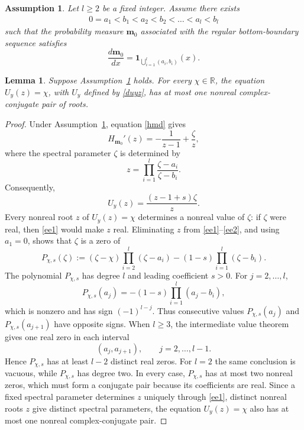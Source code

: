 \documentclass[11pt]{amsart}
\theoremstyle{plain}
\newtheorem{lemma}[theorem]{Lemma}
\newtheorem{assumption}[theorem]{Assumption}
\numberwithin{equation}{section}
\numberwithin{theorem}{section}
\numberwithin{figure}{section}
\begin{document}
\begin{assumption}\label{ap32}Let $l\geq2$ be a fixed integer. Assume there exists
\begin{align*}
    0=a_1<b_1<a_2<b_2<\ldots<a_{l}<b_l
\end{align*}
such that the probability measure $\mathbf m_0$ associated with the
regular bottom-boundary sequence satisfies
\[
    \frac{d\mathbf m_0}{dx}
    =
    \mathbf 1_{\bigcup_{i=1}^l(a_i,b_i)}(x).
\]
\end{assumption}

\begin{lemma}
\label{le49}
Suppose Assumption~\ref{ap32} holds. For every $\chi\in\mathbb R$, the
equation $U_y(z)=\chi$, with $U_y$ defined by \eqref{duyz}, has at most
one nonreal complex-conjugate pair of roots.
\end{lemma}

\begin{proof}
Under Assumption~\ref{ap32}, equation \eqref{hmd} gives
\[
    H_{\mathbf m_0}'(z)
    =
    -\frac{1}{z-1}+\frac{\zeta}{z},
\]
where the spectral parameter $\zeta$ is determined by
\begin{equation}
    z
    =
    \prod_{i=1}^{l}
    \frac{\zeta-a_i}{\zeta-b_i}.
    \label{ee1}
\end{equation}
Consequently,
\begin{equation}
    U_y(z)
    =
    \frac{(z-1+s)\zeta}{z}.
    \label{ee2}
\end{equation}
Every nonreal root $z$ of $U_y(z)=\chi$ determines a nonreal value of
$\zeta$: if $\zeta$ were real, then \eqref{ee1} would make $z$ real.
Eliminating $z$ from \eqref{ee1}--\eqref{ee2}, and using $a_1=0$, shows
that $\zeta$ is a zero of
\begin{equation}
    P_{\chi,s}(\zeta)
    :=
    (\zeta-\chi)
    \prod_{i=2}^{l}(\zeta-a_i)
    -(1-s)
    \prod_{i=1}^{l}(\zeta-b_i).
    \label{eq:spectral-polynomial}
\end{equation}
The polynomial $P_{\chi,s}$ has degree $l$ and leading coefficient
$s>0$. For $j=2,\ldots,l$,
\[
    P_{\chi,s}(a_j)
    =
    -(1-s)\prod_{i=1}^{l}(a_j-b_i),
\]
which is nonzero and has sign $(-1)^{l-j}$. Thus consecutive values
$P_{\chi,s}(a_j)$ and $P_{\chi,s}(a_{j+1})$ have opposite signs.
When $l\geq3$, the intermediate value theorem gives one real zero in
each interval
\[
    (a_j,a_{j+1}),
    \qquad j=2,\ldots,l-1.
\]
Hence $P_{\chi,s}$ has at least $l-2$ distinct real zeros. For $l=2$
the same conclusion is vacuous, while $P_{\chi,s}$ has degree two.
In every case, $P_{\chi,s}$ has at most two nonreal zeros, which must
form a conjugate pair because its coefficients are real. Since a fixed spectral parameter determines $z$ uniquely through
\eqref{ee1}, distinct nonreal roots $z$ give distinct spectral parameters, the equation $U_y(z)=\chi$ also has at most one nonreal
complex-conjugate pair.
\end{proof}
\end{document}
